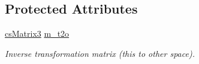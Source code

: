 \subsection*{Protected Attributes}
\begin{DoxyCompactItemize}
\item 
\hyperlink{classcsMatrix3}{cs\+Matrix3} \hyperlink{classcsReversibleTransform_af500740bc965322a64e7bc714ce7196d}{m\+\_\+t2o}\hypertarget{classcsReversibleTransform_af500740bc965322a64e7bc714ce7196d}{}\label{classcsReversibleTransform_af500740bc965322a64e7bc714ce7196d}

\begin{DoxyCompactList}\small\item\em Inverse transformation matrix (\textquotesingle{}this\textquotesingle{} to \textquotesingle{}other\textquotesingle{} space). \end{DoxyCompactList}\end{DoxyCompactItemize}
